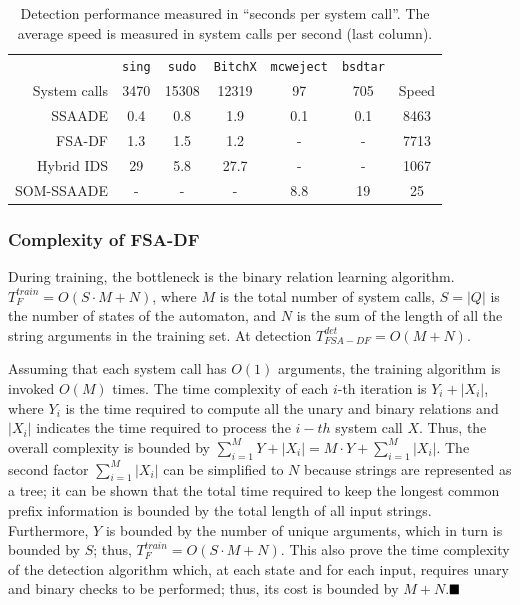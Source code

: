 \begin{table}[t]
  \centering\footnotesize

  \begin{tabular*}{\columnwidth}{@{\extracolsep{\fill}}rcccccc}
    \toprule

     & \texttt{sing} & \texttt{sudo} & \texttt{BitchX} & \texttt{mcweject} & \texttt{bsdtar} &\\

    \cmidrule{1-6}

    System calls & 3470 & 15308 & 12319 & 97 & 705 & Speed\\
    
    \midrule

    \ac{SSAADE} & 0.4 & 0.8 & 1.9 & 0.1 & 0.1 & 8463 \\
    FSA-DF & 1.3  & 1.5 & 1.2 & - & - & 7713 \\
    Hybrid IDS & 29 & 5.8 & 27.7 & - & - & 1067 \\
    SOM-\ac{SSAADE} & - & - & - & 8.8 & 19 & 25 \\

    \bottomrule
  \end{tabular*}
  \caption{Detection performance measured in ``seconds per system call''. The average speed is measured in system calls per second (last column).}
  \label{tab:performance_measurements}
\end{table}

\subsubsection{Complexity of FSA-DF}
During training, the bottleneck is the binary relation learning algorithm. $T_{F}^{train} = O(S \cdot M + N)$, where $M$ is the total number of system calls, $S = |Q|$ is the number of states of the automaton, and $N$ is the sum of the length of all the string arguments in the training set. At detection $T_{FSA-DF}^{det} = O(M + N)$.

Assuming that each system call has $O(1)$ arguments, the training algorithm is invoked $O(M)$ times. The time complexity of each $i$-th iteration is $Y_{i} + |X_{i}|$, where $Y_{i}$ is the time required to compute all the unary and binary relations and $|X_{i}|$ indicates the time required to process the $i-th$ system call $X$. Thus, the overall complexity is bounded by $\sum^{M}_{i=1} Y + |X_{i}| = M \cdot Y + \sum^{M}_{i=1} |X_{i}|$. The second factor $\sum^{M}_{i=1} |X_{i}|$ can be simplified to $N$ because strings are represented as a tree; it can be shown \citep{venkat_dataflow} that the total time required to keep the longest common prefix information is bounded by the total length of all input strings. Furthermore, $Y$ is bounded by the number of unique arguments, which in turn is bounded by $S$; thus, $T^{train}_{F} = O(S \cdot M + N)$. This also prove the time complexity of the detection algorithm which, at each state and for each input, requires unary and binary checks to be performed; thus, its cost is bounded by $M + N$.\hfill $\qed$\\

